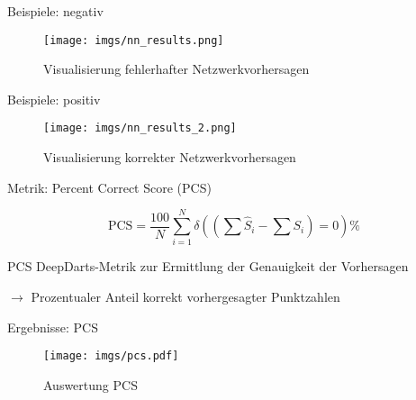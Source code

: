 \begin{frame}{Beispiele: negativ}
    \begin{figure}
        \centering
        \texttt{[image: imgs/nn\_results.png]}
        \caption{Visualisierung fehlerhafter Netzwerkvorhersagen}
    \end{figure}
\end{frame}

\begin{frame}{Beispiele: positiv}
    \begin{figure}
        \centering
        \texttt{[image: imgs/nn\_results\_2.png]}
        \caption{Visualisierung korrekter Netzwerkvorhersagen}
    \end{figure}
\end{frame}

\begin{frame}{Metrik: Percent Correct Score (PCS)}

    \[ \text{PCS} = \frac{100}{N} \sum_{i=1}^{N} \delta \left(\left(\sum \hat{S}_i - \sum S_i\right) = 0\right)\% \]

    \begin{block}{PCS}
        DeepDarts-Metrik zur Ermittlung der Genauigkeit der Vorhersagen

        $\rightarrow$ Prozentualer Anteil korrekt vorhergesagter Punktzahlen
    \end{block}

\end{frame}

\begin{frame}{Ergebnisse: PCS}

    \begin{figure}
        \centering
        \texttt{[image: imgs/pcs.pdf]}
        \caption{Auswertung PCS}
    \end{figure}

\end{frame}
